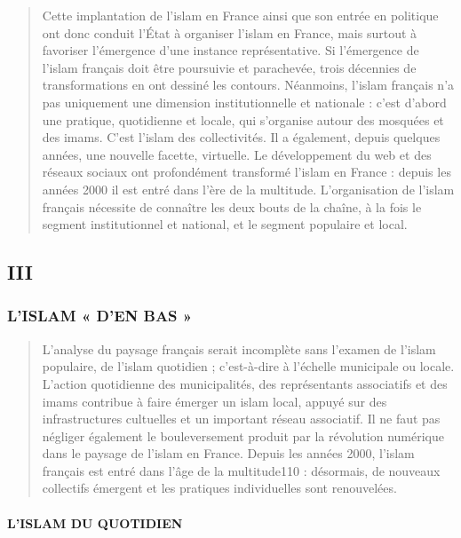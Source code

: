 \begin{quote}
Cette implantation de l'islam en France ainsi que son entrée en
politique ont donc conduit l'État à organiser l'islam en France, mais
surtout à favoriser l'émergence d'une instance représentative. Si
l'émergence de l'islam français doit être poursuivie et parachevée,
trois décennies de transformations en ont dessiné les contours.
Néanmoins, l'islam français n'a pas uniquement une dimension
institutionnelle et nationale : c'est d'abord une pratique, quotidienne
et locale, qui s'organise autour des mosquées et des imams. C'est
l'islam des collectivités. Il a également, depuis quelques années, une
nouvelle facette, virtuelle. Le développement du web et des réseaux
sociaux ont profondément transformé l'islam en France : depuis les
années 2000 il est entré dans l'ère de la multitude. L'organisation de
l'islam français nécessite de connaître les deux bouts de la chaîne, à
la fois le segment institutionnel et national, et le segment populaire
et local.
\end{quote}

\hypertarget{iii}{%
\subsection{III}\label{iii}}

\hypertarget{lislam-den-bas}{%
\subsubsection{L'ISLAM « D'EN BAS »}\label{lislam-den-bas}}

\begin{quote}
L'analyse du paysage français serait incomplète sans l'examen de l'islam
populaire, de l'islam quotidien ; c'est-à-dire à l'échelle municipale ou
locale. L'action quotidienne des municipalités, des représentants
associatifs et des imams contribue à faire émerger un islam local,
appuyé sur des infrastructures cultuelles et un important réseau
associatif. Il ne faut pas négliger également le bouleversement produit
par la révolution numérique dans le paysage de l'islam en France. Depuis
les années 2000, l'islam français est entré dans l'âge de la
multitude110 : désormais, de nouveaux collectifs émergent et les
pratiques individuelles sont renouvelées.
\end{quote}

\hypertarget{lislam-du-quotidien}{%
\paragraph{L'ISLAM DU QUOTIDIEN}\label{lislam-du-quotidien}}

